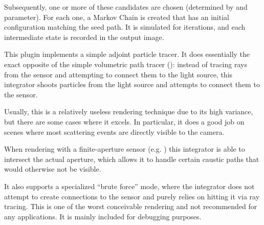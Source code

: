 Subsequently, one or more of these candidates are chosen (determined by
 and  parameter). For each one, a Markov
Chain is created that has an initial configuration matching the seed path.
It is simulated for  iterations, and each intermediate
state is recorded in the output image.

This plugin implements a simple adjoint particle tracer. It does
essentially the exact opposite of the simple volumetric path tracer
(): instead of tracing rays from
the sensor and attempting to connect them to the light source, this
integrator shoots particles from the light source and attempts to connect
them to the sensor.

Usually, this is a relatively useless rendering technique due to
its high variance, but there are some cases where it excels.
In particular, it does a good job on scenes where most scattering
events are directly visible to the camera.

When rendering with a finite-aperture sensor (e.g. )
this integrator is able to intersect the actual aperture, which allows
it to handle certain caustic paths that would otherwise not be visible.

It also supports a specialized ``brute force'' mode, where the integrator
does not attempt to create connections to the sensor and purely relies on
hitting it via ray tracing. This is one of the worst conceivable rendering
and not recommended for any applications. It is mainly included for
debugging purposes.


